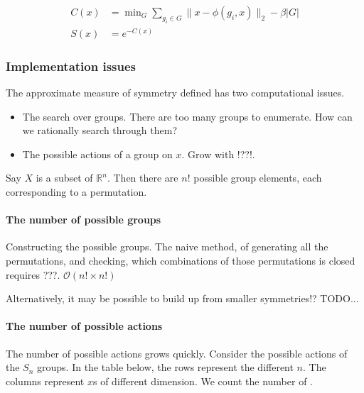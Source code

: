 
\begin{align*}
C(x) &= \mathop{\text{min}}_G \sum_{g_i\in G}\parallel x-\phi(g_i, x)\parallel_2 - \beta |G|\\
S(x) &= e^{-C(x)}
\end{align*}


\subsubsection{Implementation issues}

The approximate measure of symmetry defined has two computational issues.

\begin{itemize}
	\tightlist
	\item The search over groups. There are too many groups to enumerate. How can we rationally search through them?
	\item The possible actions of a group on $x$. Grow with !??!.
\end{itemize}

Say $X$ is a subset of $\mathbb R^n$. Then there are $n!$ possible group elements, each corresponding to a permutation.



\paragraph{The number of possible groups}

Constructing the possible groups. The naive method, of generating all the permutations, and checking, which combinations of those permutations is closed requires ???.  $\mathcal O(n! \times n!)$

Alternatively, it may be possible to build up from smaller symmetries!? TODO...

\paragraph{The number of possible actions}

The number of possible actions grows quickly. Consider the possible actions of the $S_n$ groups.
In the table below, the rows represent the different $n$. The columns represent $x$s of different dimension.
We count the number of .

